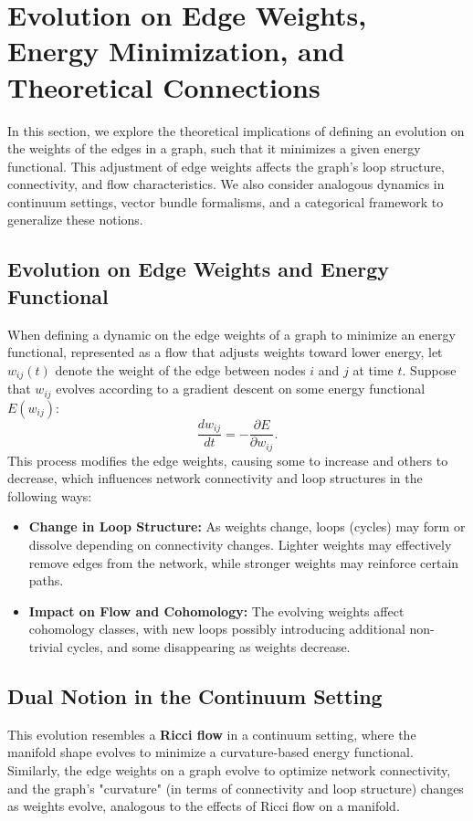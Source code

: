 \documentclass[10pt,a4paper,twocolumn]{article}
\begin{document}
	
	\section{Evolution on Edge Weights, Energy Minimization, and Theoretical Connections}
	
	In this section, we explore the theoretical implications of defining an evolution on the weights of the edges in a graph, such that it minimizes a given energy functional. This adjustment of edge weights affects the graph’s loop structure, connectivity, and flow characteristics. We also consider analogous dynamics in continuum settings, vector bundle formalisms, and a categorical framework to generalize these notions.
	
	\subsection{Evolution on Edge Weights and Energy Functional}
	When defining a dynamic on the edge weights of a graph to minimize an energy functional, represented as a flow that adjusts weights toward lower energy, let \( w_{ij}(t) \) denote the weight of the edge between nodes \( i \) and \( j \) at time \( t \). Suppose that \( w_{ij} \) evolves according to a gradient descent on some energy functional \( E(w_{ij}) \):
	\[
	\frac{d w_{ij}}{dt} = -\frac{\partial E}{\partial w_{ij}}.
	\]
	This process modifies the edge weights, causing some to increase and others to decrease, which influences network connectivity and loop structures in the following ways:
	\begin{itemize}
		\item \textbf{Change in Loop Structure:} As weights change, loops (cycles) may form or dissolve depending on connectivity changes. Lighter weights may effectively remove edges from the network, while stronger weights may reinforce certain paths.
		\item \textbf{Impact on Flow and Cohomology:} The evolving weights affect cohomology classes, with new loops possibly introducing additional non-trivial cycles, and some disappearing as weights decrease.
	\end{itemize}
	
	\subsection{Dual Notion in the Continuum Setting}
	This evolution resembles a \textbf{Ricci flow} in a continuum setting, where the manifold shape evolves to minimize a curvature-based energy functional. Similarly, the edge weights on a graph evolve to optimize network connectivity, and the graph’s "curvature" (in terms of connectivity and loop structure) changes as weights evolve, analogous to the effects of Ricci flow on a manifold.
	
\end{document}
